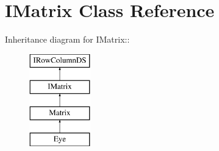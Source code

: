 \hypertarget{classIMatrix}{
\section{IMatrix Class Reference}
\label{classIMatrix}
}
Inheritance diagram for IMatrix::\begin{figure}[H]
\begin{center}
\leavevmode
\includegraphics[height=4cm]{classIMatrix}
\end{center}
\end{figure}

